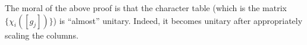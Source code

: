 \documentclass{article}
\begin{document}
\begin{remark}
	The moral of the above proof is that the character table (which is the matrix $\{\chi_i([g_j])\}$) is ``almost'' unitary. Indeed, it becomes unitary after appropriately scaling the columns.
\end{remark}


\end{document}
